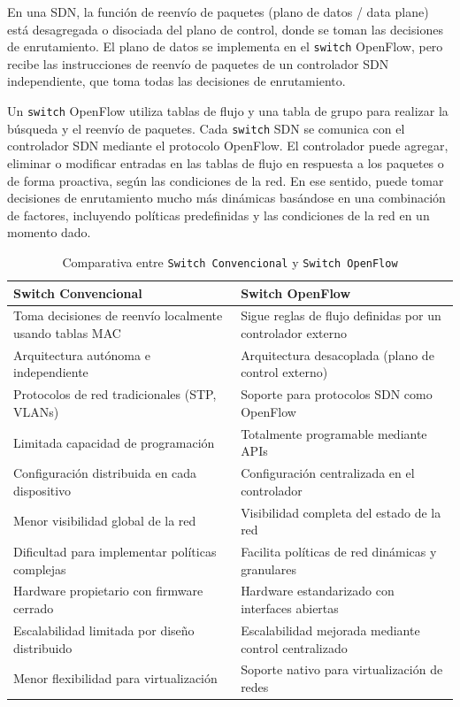 \vspace{0.25cm}

En una SDN, la función de reenvío de paquetes (plano de datos / data plane) está desagregada o disociada del plano de control, donde se toman las decisiones de enrutamiento. El plano de datos se implementa en el \texttt{switch} OpenFlow, pero recibe las instrucciones de reenvío de paquetes de un controlador SDN independiente, que toma todas las decisiones de enrutamiento.

\vspace{0.25cm}

Un \texttt{switch} OpenFlow utiliza tablas de flujo y una tabla de grupo para realizar la búsqueda y el reenvío de paquetes. Cada \texttt{switch} SDN se comunica con el controlador SDN mediante el protocolo OpenFlow. El controlador puede agregar, eliminar o modificar entradas en las tablas de flujo en respuesta a los paquetes o de forma proactiva, según las condiciones de la red. En ese sentido, puede tomar decisiones de enrutamiento mucho más dinámicas basándose en una combinación de factores, incluyendo políticas predefinidas y las condiciones de la red en un momento dado.

\vspace{0.15cm}

\begin{table}[!htbp]
\centering
\label{tab:switch-comparison}
\begin{tabular}{>{\raggedright\arraybackslash}p{6cm}>{\raggedright\arraybackslash}p{6cm}}
\toprule
\textbf{Switch Convencional} & \textbf{Switch OpenFlow} \\
\midrule
Toma decisiones de reenvío localmente usando tablas MAC & Sigue reglas de flujo definidas por un controlador externo \\
\midrule
Arquitectura autónoma e independiente & Arquitectura desacoplada (plano de control externo) \\
\midrule
Protocolos de red tradicionales (STP, VLANs) & Soporte para protocolos SDN como OpenFlow \\
\midrule
Limitada capacidad de programación & Totalmente programable mediante APIs \\
\midrule
Configuración distribuida en cada dispositivo & Configuración centralizada en el controlador \\
\midrule
Menor visibilidad global de la red & Visibilidad completa del estado de la red \\
\midrule
Dificultad para implementar políticas complejas & Facilita políticas de red dinámicas y granulares \\
\midrule
Hardware propietario con firmware cerrado & Hardware estandarizado con interfaces abiertas \\
\midrule
Escalabilidad limitada por diseño distribuido & Escalabilidad mejorada mediante control centralizado \\
\midrule
Menor flexibilidad para virtualización & Soporte nativo para virtualización de redes \\
\bottomrule
\end{tabular}
\caption{Comparativa entre \texttt{Switch Convencional} y \texttt{Switch OpenFlow}}
\end{table}


